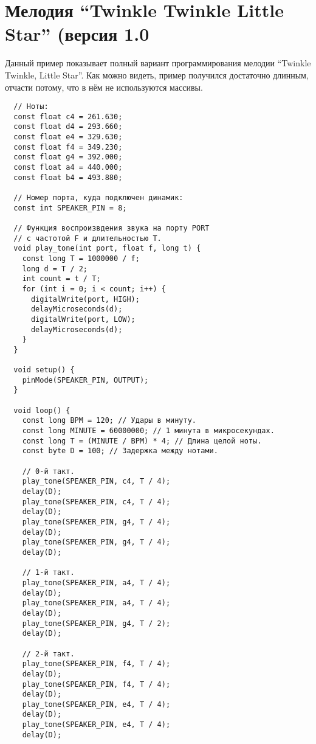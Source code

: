 \documentclass[../sparc.tex]{subfiles}
\begin{document}
\newpage
\section{Мелодия ``Twinkle Twinkle Little Star'' (версия 1.0}
\label{app:twinkle-twinkle-little-star-01}

Данный пример показывает полный вариант программирования мелодии ``Twinkle
Twinkle, Little Star''. Как можно видеть, пример получился достаточно длинным,
отчасти потому, что в нём не используются массивы.

\begin{verbatim}
  // Ноты:
  const float c4 = 261.630;
  const float d4 = 293.660;
  const float e4 = 329.630;
  const float f4 = 349.230;
  const float g4 = 392.000;
  const float a4 = 440.000;
  const float b4 = 493.880;

  // Номер порта, куда подключен динамик:
  const int SPEAKER_PIN = 8;

  // Функция воспроизвдения звука на порту PORT
  // с частотой F и длительностью T.
  void play_tone(int port, float f, long t) {
    const long T = 1000000 / f;
    long d = T / 2;
    int count = t / T;
    for (int i = 0; i < count; i++) {
      digitalWrite(port, HIGH);
      delayMicroseconds(d);
      digitalWrite(port, LOW);
      delayMicroseconds(d);
    }
  }

  void setup() {
    pinMode(SPEAKER_PIN, OUTPUT);
  }

  void loop() {
    const long BPM = 120; // Удары в минуту.
    const long MINUTE = 60000000; // 1 минута в микросекундах.
    const long T = (MINUTE / BPM) * 4; // Длина целой ноты.
    const byte D = 100; // Задержка между нотами.

    // 0-й такт.
    play_tone(SPEAKER_PIN, c4, T / 4);
    delay(D);
    play_tone(SPEAKER_PIN, c4, T / 4);
    delay(D);
    play_tone(SPEAKER_PIN, g4, T / 4);
    delay(D);
    play_tone(SPEAKER_PIN, g4, T / 4);
    delay(D);

    // 1-й такт.
    play_tone(SPEAKER_PIN, a4, T / 4);
    delay(D);
    play_tone(SPEAKER_PIN, a4, T / 4);
    delay(D);
    play_tone(SPEAKER_PIN, g4, T / 2);
    delay(D);

    // 2-й такт.
    play_tone(SPEAKER_PIN, f4, T / 4);
    delay(D);
    play_tone(SPEAKER_PIN, f4, T / 4);
    delay(D);
    play_tone(SPEAKER_PIN, e4, T / 4);
    delay(D);
    play_tone(SPEAKER_PIN, e4, T / 4);
    delay(D);


\end{verbatim}
\end{document}
